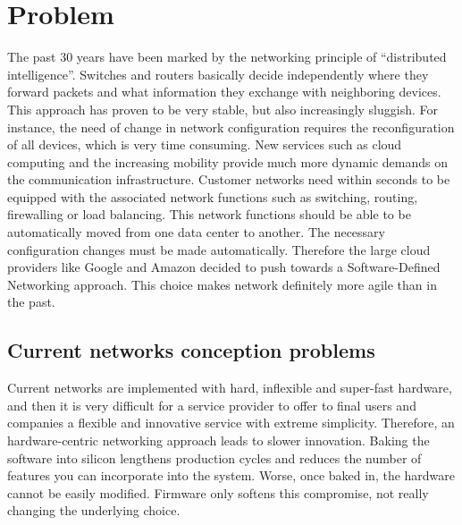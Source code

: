 \chapter{Problem}
\label{chap:State of the Art}
\label{chap:Problem}

The past 30 years have been marked by the networking principle of ``distributed intelligence''. Switches and routers basically decide independently where they forward packets and what information they exchange with neighboring devices. This approach has proven to be very stable, but also increasingly sluggish. For instance, the need of change in network configuration requires the reconfiguration of all devices, which is very time consuming.
New services such as cloud computing and the increasing mobility provide much more dynamic demands on the communication infrastructure. Customer networks need within seconds to be equipped with the associated network functions such as switching, routing, firewalling or load balancing. This network functions should be able to be automatically moved from one data center to another. The necessary configuration changes must be made automatically. Therefore the large cloud providers like Google and Amazon decided to push towards a Software-Defined Networking approach. This choice makes network definitely more agile than in the past.


\section{Current networks conception problems}

Current networks are implemented with hard, inflexible and super-fast hardware, and then it is very difficult for a service provider to offer to final users and companies a flexible  
and innovative service with extreme simplicity. Therefore, an hardware-centric networking approach leads to slower innovation. Baking the software into silicon lengthens production cycles and reduces the number of features you can incorporate into the system. Worse, once baked in, the hardware cannot be easily modified. Firmware only softens this compromise, not really changing the underlying choice.

